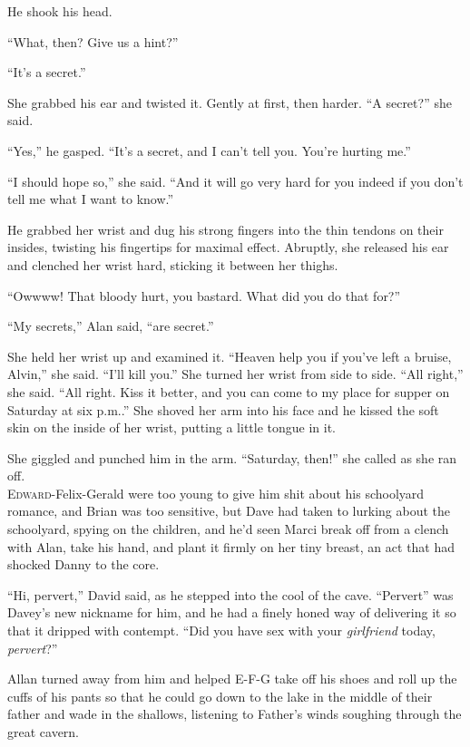\documentclass{article}
\begin{document}
He shook his head.

``What, then?  Give us a hint?''

``It's a secret.''

She grabbed his ear and twisted it.  Gently at first, then harder. 
``A secret?'' she said.

``Yes,'' he gasped.  ``It's a secret, and I can't tell you.  You're
hurting me.''

``I should hope so,'' she said.  ``And it will go very hard for you
indeed if you don't tell me what I want to know.''

He grabbed her wrist and dug his strong fingers into the thin tendons
on their insides, twisting his fingertips for maximal effect. 
Abruptly, she released his ear and clenched her wrist hard, sticking
it between her thighs.

``Owwww!  That bloody hurt, you bastard.  What did you do that for?''

``My secrets,'' Alan said, ``are secret.''

She held her wrist up and examined it.  ``Heaven help you if you've
left a bruise, Alvin,'' she said.  ``I'll kill you.'' She turned her
wrist from side to side.  ``All right,'' she said.  ``All right.  Kiss
it better, and you can come to my place for supper on Saturday at six
p.m..'' She shoved her arm into his face and he kissed the soft skin
on the inside of her wrist, putting a little tongue in it.

She giggled and punched him in the arm.  ``Saturday, then!'' she
called as she ran off.
\\
\lettrine[lines=3, lhang=.5, nindent=0pt, findent=2pt]{E}{dward}-Felix-Gerald were too young to give him shit about his
schoolyard romance, and Brian was too sensitive, but Dave had taken to
lurking about the schoolyard, spying on the children, and he'd seen
Marci break off from a clench with Alan, take his hand, and plant it
firmly on her tiny breast, an act that had shocked Danny to the core.

``Hi, pervert,'' David said, as he stepped into the cool of the cave. 
``Pervert'' was Davey's new nickname for him, and he had a finely
honed way of delivering it so that it dripped with contempt.  ``Did
you have sex with your \textit{girlfriend} today, \textit{pervert}?''

Allan turned away from him and helped E-F-G take off his shoes and
roll up the cuffs of his pants so that he could go down to the lake in
the middle of their father and wade in the shallows, listening to
Father's winds soughing through the great cavern.
\end{document}
